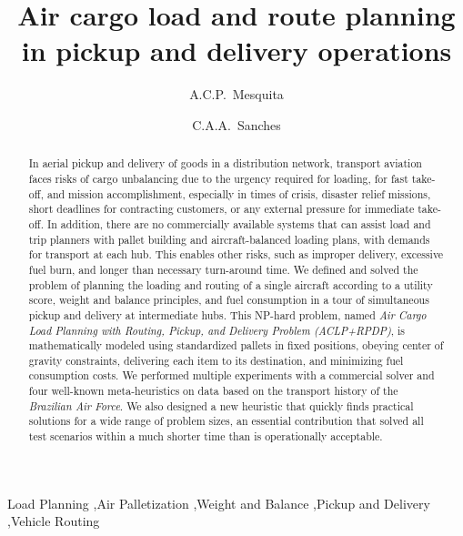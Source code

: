 \documentclass[preprint]{elsarticle}
\begin{document}
\begin{frontmatter}

\title{Air cargo load and route planning in pickup and delivery operations}

\author{A.C.P.~Mesquita}

\author{C.A.A.~Sanches}

\address {Instituto Tecnol\'{o}gico de Aeron\'{a}utica - DCTA/ITA/IEC\\
Pra\c{c}a Mal. Eduardo Gomes, 50\\
S\~{a}o Jos\'{e} dos Campos - SP - 12.228-900 - Brazil}


\begin{abstract}

In aerial pickup and delivery of goods in a distribution network, transport aviation faces risks of cargo unbalancing due to the urgency required for loading, for fast take-off, and mission accomplishment, especially in times of crisis, disaster relief missions, short deadlines for contracting customers, or any external pressure for immediate take-off. {\color{blue} In addition, there are no commercially available systems that can assist load and trip planners with pallet building and aircraft-balanced loading plans, with demands for transport at each hub.} This enables other risks, such as improper delivery, excessive fuel burn, and longer than necessary turn-around time. We defined and solved the problem of planning the loading and routing of a single aircraft according to a utility score, weight and balance principles, and fuel consumption in a tour of simultaneous pickup and delivery at intermediate hubs. This NP-hard problem, named {\it Air Cargo Load Planning with Routing, Pickup, and Delivery Problem (ACLP+RPDP)}, is mathematically modeled using standardized pallets in fixed positions, obeying center of gravity constraints, delivering each item to its destination, and minimizing fuel consumption costs. We performed multiple experiments with a commercial solver and four well-known meta-heuristics on data based on the transport history of the {\it Brazilian Air Force}. {\color{blue}We also designed a new heuristic that quickly finds practical solutions for a wide range of problem sizes, an essential contribution that solved all test scenarios within a much shorter time than is operationally acceptable.}


\end{abstract}

\begin{keyword}
Load Planning \sep Air Palletization \sep Weight and Balance \sep Pickup and Delivery \sep Vehicle Routing
\end{keyword}

\end{frontmatter}
\end{document}
